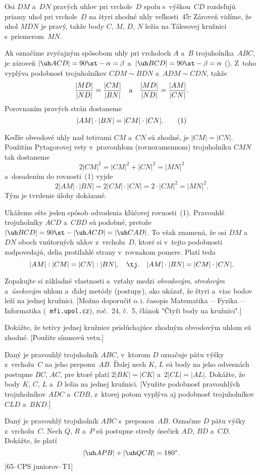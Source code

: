 {%
Osi $DM$ a~$DN$ pravých uhlov pri vrchole~$D$ spolu s~výškou~$CD$ rozdeľujú
priamy uhol pri vrchole~$D$ na štyri zhodné uhly veľkosti~45\st.
Zároveň vidíme, že uhol $MDN$ je pravý, takže body $C$, $M$, $D$, $N$
ležia na Tálesovej kružnici s~priemerom~$MN$.

Ak označíme zvyčajným spôsobom uhly pri vrcholoch $A$ a~$B$ trojuholníka~$ABC$,
je zároveň $|\uh ACD|=90\st-\alpha=\beta$ a~$|\uh BCD|=90\st-\beta=\alpha$ (\obr).
Z~toho vyplýva podobnosť trojuholníkov $CDM\sim BDN$ a~$ADM\sim CDN$, takže
$$
\frac{|MD|}{|ND|}=\frac{|CM|}{|BN|}\quad\hbox{a}\quad
\frac{|MD|}{|ND|}=\frac{|AM|}{|CN|}.
$$
Porovnaním pravých strán dostaneme
$$
\belowdisplayskip 0pt
|AM|\cdot|BN|=|CM|\cdot |CN|. \tag1
$$
%

Keďže obvodové uhly nad tetivami $CM$ a~$CN$ sú zhodné, je $|CM|=|CN|$.
Použitím Pytagorovej vety v~pravouhlom (rovnoramennom) trojuholníku $CMN$ tak
dostaneme
$$
2|CM|^2=|CM|^2+|CN|^2=|MN|^2
$$
a~dosadením do rovnosti~(1) vyjde
$$
2 |AM|\cdot |BN|=2 |CM|\cdot |CN|=2\cdot |CM|^2=|MN|^2.
$$
Tým je tvrdenie úlohy dokázané.


\poznamka
Ukážeme ešte jeden spôsob odvodenia kľúčovej rovnosti~(1).
Pravouhlé trojuholníky $ACD$ a~$CBD$ sú podobné, pretože
$|\uh BCD|=90\st-|\uh ACD|=|\uh CAD|$. To však znamená, že
osi $DM$ a~$DN$ oboch vnútorných uhlov z~vrcholu~$D$, ktoré si v~tejto podobnosti
zodpovedajú, delia protiľahlé strany
v~rovnakom pomere. Platí teda
$$
|AM|:|CM|=|CN|:|BN|, \quad \text{\tj.} \quad |AM|\cdot |BN|=|CM|\cdot |CN|.
$$


Zopakujte si základné vlastnosti a~vzťahy medzi {\it
obvodovým}, {\it stredovým\/} a~{\it úsekovým\/} uhlom a~ďalej
metódy (postupy), ako ukázať, že štyri a~viac bodov leží na jednej
kružnici.
[Možno doporučiť o.\,i. časopis Matematika~-- Fyzika~-- Informatika ({\tt
mfi.upol.cz}), roč.~24, č.~5, článok "Čtyři body na kružnici".]

Dokážte, že tetivy jednej kružnice prislúchajúce zhodným obvodovým uhlom sú zhodné.
[Použite sínusovú vetu.]

Daný je pravouhlý trojuholník $ABC$, v~ktorom $D$ označuje pätu
výšky z~vrcholu~$C$ na jeho preponu~$AB$. Ďalej nech $K$, $L$ sú
body na jeho odvesnách postupne $BC$, $AC$, pre ktoré platí
$2|BK|=|CK|$ a~$2|CL|=|AL|$. Dokážte, že body $K$, $C$, $L$ a~$D$
ležia na jednej kružnici. [Využite podobnosť pravouhlých trojuholníkov $ADC$
a~$CDB$, z~ktorej potom vyplýva aj podobnosť trojuholníkov $CLD$ a~$BKD$.]

\D
Daný je pravouhlý trojuholník $ABC$ s~preponou~$AB$. Označme $D$ pätu výšky z~vrcholu~$C$. Nech $Q$, $R$ a~$P$ sú postupne stredy úsečiek $AD$, $BD$ a~$CD$. Dokážte, že platí
$$
|\uh APB|+|\uh QCR|=180^{\circ}.
$$
[65--CPS juniorov--T1]
}

